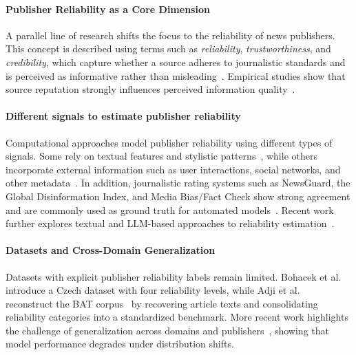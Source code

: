 \documentclass[journal]{IEEEtran}
\begin{document}
\paragraph{Publisher Reliability as a Core Dimension} A parallel line of research shifts the focus to the reliability of news publishers. This concept is described using terms such as \emph{reliability}, \emph{trustworthiness}, and \emph{credibility}, which capture whether a source adheres to journalistic standards and is perceived as informative rather than misleading~\cite{digitalmedia2007,infodisorder2017,10.1145/302979.303001}. Empirical studies show that source reputation strongly influences perceived information quality~\cite{doi:10.1080/07421222.2019.1628921}. 

\paragraph{Different signals to estimate publisher reliability} Computational approaches model publisher reliability using different types of signals. Some rely on textual features and stylistic patterns~\cite{przybyla2021classification}, while others incorporate external information such as user interactions, social networks, and other metadata~\cite{bazmi2023multi,DBLP:conf/ecir/PratelliSP25,DBLP:conf/icwsm/WilliamsCC25,DBLP:journals/jdiq/LongoZCZC25}. In addition, journalistic rating systems such as NewsGuard, the Global Disinformation Index, and Media Bias/Fact Check show strong agreement and are commonly used as ground truth for automated models~\cite{lin2023high,DBLP:conf/icwsm/PratelliP22}. Recent work further explores textual and LLM-based approaches to reliability estimation~\cite{10.1145/3770077,nakov2024survey,yang2023large,Leite2025}.

\paragraph{Datasets and Cross-Domain Generalization} Datasets with explicit publisher reliability labels remain limited. Bohacek et al.~\cite{bohavcek2022fine} introduce a Czech dataset with four reliability levels, while Adji et al.~\cite{DBLP:journals/dbsk/AdjiLS26} reconstruct the BAT corpus~\cite{batDataset} by recovering article texts and consolidating reliability categories into a standardized benchmark. More recent work highlights the challenge of generalization across domains and publishers~\cite{azizov-etal-2024-safari,burdisso-etal-2024-reliability,verhoeven2025yesterday}, showing that model performance degrades under distribution shifts.
\end{document}

